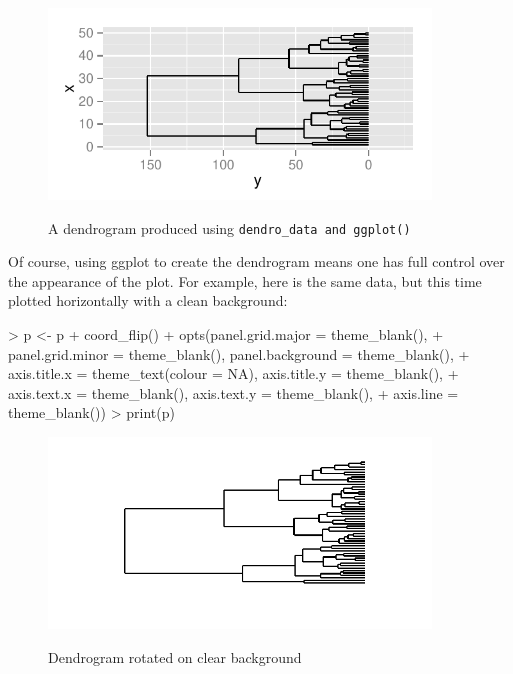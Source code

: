 \documentclass[a4paper]{article}
\newcommand{\dendrodata}{\tt dendro\_data}
\newcommand{\code}[1]{\tt #1}
\begin{document}
\begin{figure}[h]
\begin{center}
{
\includegraphics[width=4in, height=2in]{ggdendro-dendro1}
}
\end{center}
\caption{A dendrogram produced using \dendrodata{} and \code{ggplot()}}
\end{figure}


Of course, using ggplot to create the dendrogram means one has full control over the appearance of the plot.  For example, here is the same data, but this time plotted horizontally with a clean background:

\begin{Schunk}
\begin{Sinput}
> p <- p + coord_flip() + opts(panel.grid.major = theme_blank(), 
+     panel.grid.minor = theme_blank(), panel.background = theme_blank(), 
+     axis.title.x = theme_text(colour = NA), axis.title.y = theme_blank(), 
+     axis.text.x = theme_blank(), axis.text.y = theme_blank(), 
+     axis.line = theme_blank())
> print(p)
\end{Sinput}
\end{Schunk}

\begin{figure}[h]
\begin{center}
{
\includegraphics[width=4in, height=2in]{ggdendro-dendro2}
}
\end{center}
\caption{Dendrogram rotated on clear background}
\end{figure}
\end{document}

